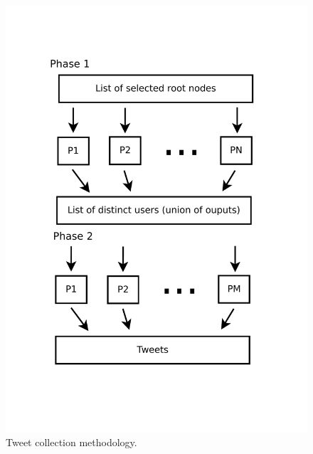 \begin{figure}
\includegraphics[width=.7\textwidth]{./img/CollectionProcess.pdf}
\caption{Tweet collection methodology.}
\label{fig:methodology}
\end{figure}

